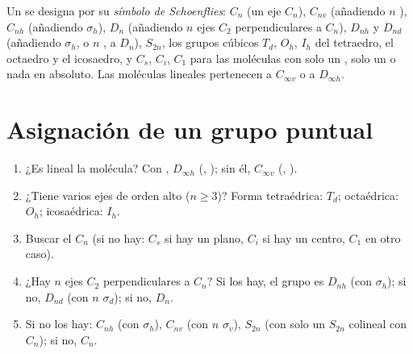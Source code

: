 \begin{definition}\label{def:b3:point-groups:schoenflies}
Un  se designa por su \emph{símbolo de Schoenflies}:
$C_n$ (un eje $C_n$), $C_{nv}$ (añadiendo $n$ ), $C_{nh}$
(añadiendo $\sigma_h$), $D_n$ (añadiendo $n$ ejes $C_2$ perpendiculares a $C_n$), $D_{nh}$
y $D_{nd}$ (añadiendo $\sigma_h$, o $n$ , a $D_n$), $S_{2n}$, los
grupos cúbicos $T_d$, $O_h$, $I_h$ del tetraedro, el octaedro y el
icosaedro, y $C_s$, $C_i$, $C_1$ para las moléculas con solo un ,
solo un  o nada en absoluto. Las moléculas lineales pertenecen a
$C_{\infty v}$ o a $D_{\infty h}$.
\end{definition}

\section{Asignación de un grupo puntual}

\begin{method}\label{met:b3:point-groups:assign}
\begin{enumerate}
  \item ¿Es lineal la molécula? Con , $D_{\infty h}$
        (, ); sin él, $C_{\infty v}$ (, ).
  \item ¿Tiene varios ejes de orden alto ($n \ge 3$)? Forma tetraédrica:
        $T_d$; octaédrica: $O_h$; icosaédrica: $I_h$.
  \item Buscar el  $C_n$ (si no hay: $C_s$ si hay un plano, $C_i$ si hay un
        centro, $C_1$ en otro caso).
  \item ¿Hay $n$ ejes $C_2$ perpendiculares a $C_n$? Si los hay, el grupo es
        $D_{nh}$ (con $\sigma_h$); si no, $D_{nd}$ (con $n$ $\sigma_d$); si no,
        $D_n$.
  \item Si no los hay: $C_{nh}$ (con $\sigma_h$), $C_{nv}$ (con $n$ $\sigma_v$), $S_{2n}$
        (con solo un $S_{2n}$ colineal con $C_n$); si no, $C_n$.
\end{enumerate}
\end{method}

